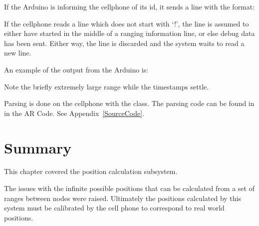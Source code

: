 If the Arduino is informing the cellphone of its id, it sends a line with the format:

\begin{center}
\end{center}


If the cellphone reads a line which does not start with `!', the line is assumed to either have started in the middle of a ranging information line, or else debug data has been sent. Either way, the line is discarded and the system waits to read a new line.

An example of the output from the Arduino is:


Note the briefly extremely large range while the timestamps settle.

Parsing is done on the cellphone with the  class. The parsing code can be found in  in the AR Code. See Appendix~\ref{SourceCode}.

\section{Summary}
This chapter covered the position calculation subsystem.

The issues with the infinite possible positions that can be calculated from a set of ranges between nodes were raised. Ultimately the positions calculated by this system must be calibrated by the cell phone to correspond to real world positions.

